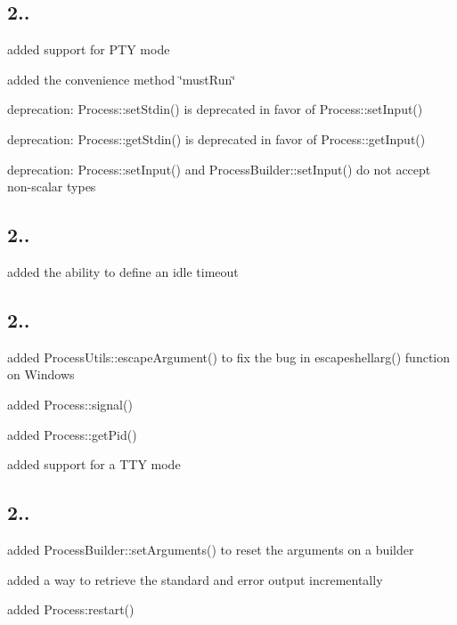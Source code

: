 \subsection*{2.. }


\begin{DoxyItemize}
\item added support for P\+T\+Y mode
\item added the convenience method \char`\"{}must\+Run\char`\"{}
\item deprecation\+: Process\+::set\+Stdin() is deprecated in favor of Process\+::set\+Input()
\item deprecation\+: Process\+::get\+Stdin() is deprecated in favor of Process\+::get\+Input()
\item deprecation\+: Process\+::set\+Input() and Process\+Builder\+::set\+Input() do not accept non-\/scalar types
\end{DoxyItemize}

\subsection*{2.. }


\begin{DoxyItemize}
\item added the ability to define an idle timeout
\end{DoxyItemize}

\subsection*{2.. }


\begin{DoxyItemize}
\item added Process\+Utils\+::escape\+Argument() to fix the bug in escapeshellarg() function on Windows
\item added Process\+::signal()
\item added Process\+::get\+Pid()
\item added support for a T\+T\+Y mode
\end{DoxyItemize}

\subsection*{2.. }


\begin{DoxyItemize}
\item added Process\+Builder\+::set\+Arguments() to reset the arguments on a builder
\item added a way to retrieve the standard and error output incrementally
\item added Process\+:restart()
\end{DoxyItemize}

